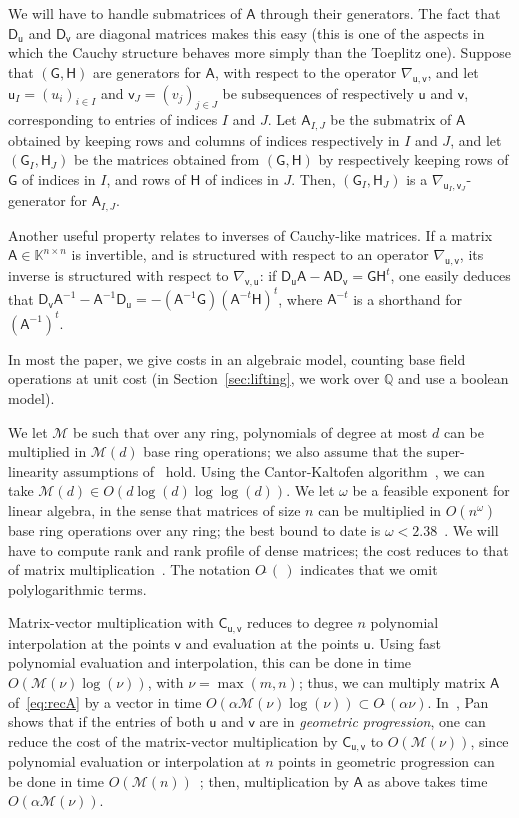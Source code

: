 \documentclass[sigconf]{acmart}
\newcommand{\vu}{\ensuremath{\mathsf{u}}}
\newcommand{\vv}{\ensuremath{\mathsf{v}}}
\newcommand{\mA}{\ensuremath{\mathsf{A}}}
\newcommand{\mC}{\ensuremath{\mathsf{C}}}
\newcommand{\mD}{\ensuremath{\mathsf{D}}}
\newcommand{\mG}{\ensuremath{\mathsf{G}}}
\newcommand{\mH}{\ensuremath{\mathsf{H}}}
\newcommand{\K}{\ensuremath{\mathbb{K}}}
\newcommand{\Q}{\ensuremath{\mathbb{Q}}}
\newcommand{\M}{\ensuremath{\mathscr{M}}}
\newcommand{\mx}{\ensuremath{\nu}}
\newcommand{\Otilde}[1]{\ensuremath{O\tilde{~}(#1)}} %
\theoremstyle{acmdefinition}
\begin{document}
We will have to handle submatrices of $\mA$ through their
generators. The fact that $\mD_{\vu}$ and $\mD_{\vv}$ are diagonal
matrices makes this easy (this is one of the aspects in which the
Cauchy structure behaves more simply than the Toeplitz one).  Suppose
that $(\mG,\mH)$ are generators for $\mA$, with respect to the
operator $\nabla_{\vu,\vv}$, and let $\vu_I=(u_i)_{i \in I}$ and
$\vv_J=(v_j)_{j \in J}$ be subsequences of respectively $\vu$ and
$\vv$, corresponding to entries of indices $I$ and $J$. Let
$\mA_{I,J}$ be the submatrix of $\mA$ obtained by keeping rows and
columns of indices respectively in $I$ and $J$, and let
$(\mG_I,\mH_J)$ be the matrices obtained from $(\mG,\mH)$ by
respectively keeping rows of $\mG$ of indices in $I$, and rows of
$\mH$ of indices in $J$. Then, $(\mG_I,\mH_J)$ is a
$\nabla_{\vu_I,\vv_J}$-generator for $\mA_{I,J}$.

Another useful property relates to inverses of Cauchy-like matrices.
If a matrix $\mA \in \K^{n\times n}$ is invertible, and is structured
with respect to an operator $\nabla_{\vu,\vv}$, its inverse is
structured with respect to $\nabla_{\vv,\vu}$: if $\mD_\vu \mA - \mA
\mD_\vv = \mG \mH^t$, one easily deduces that $\mD_\vv \mA^{-1} -
\mA^{-1} \mD_\vu = - (\mA^{-1} \mG) (\mA^{-t} \mH)^t$, where $\mA^{-t}$
is a shorthand for $(\mA^{-1})^t$.


\smallskip{}  In most the paper, we
give costs in an algebraic model, counting base field operations at
unit cost (in Section~\ref{sec:lifting}, we work over $\Q$ and use 
a boolean model).

We let $\M$ be such that over any ring, polynomials of degree at most
$d$ can be multiplied in $\M(d)$ base ring operations; we also assume
that the super-linearity assumptions of~\cite[Chapter~8]{GaGe13}
hold. Using the Cantor-Kaltofen algorithm~\cite{CaKa91}, we can take
$\M(d)\in O(d \log(d)\log\log(d))$. We let $\omega$ be a feasible
exponent for linear algebra, in the sense that matrices of size $n$
can be multiplied in $O(n^\omega)$ base ring operations over any ring;
the best bound to date is $\omega < 2.38$~\cite{CoWi90, LeGall14}.  We
will have to compute rank and rank profile of dense matrices; the cost
reduces to that of matrix multiplication~\cite{IbMoHu82}. The notation
$\Otilde{\,}$ indicates that we omit polylogarithmic terms.

Matrix-vector multiplication with $\mC_{\vu,\vv}$ reduces to degree
$n$ polynomial interpolation at the points $\vv$ and evaluation at the
points $\vu$. Using fast polynomial evaluation and interpolation, this
can be done in time $O(\M(\mx)\log(\mx))$, with $\mx=\max(m,n)$; thus, we
can multiply matrix $\mA$ of~\eqref{eq:recA} by a vector in time
$O(\alpha \M(\mx)\log(\mx))\subset \Otilde{\alpha \mx}$.
In~\cite[Theorem~4.7.3]{Pan01}, Pan shows that if the entries of both
$\vu$ and $\vv$ are in {\em geometric progression}, one can reduce the
cost of the matrix-vector multiplication by $\mC_{\vu,\vv}$ to
$O(\M(\mx))$, since polynomial evaluation or interpolation at $n$
points in geometric progression can be done in time $O(\M(n))$~\cite{Bluestein70,BoSc05};
then, multiplication by $\mA$ as above takes time
$O(\alpha\M(\mx))$.
\end{document}
